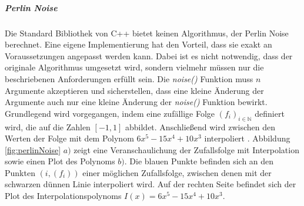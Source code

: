 \documentclass[11pt,a4paper]{article}
\begin{document}
\subparagraph{Perlin Noise}
Die Standard Bibliothek von C++ bietet keinen Algorithmus, der Perlin Noise berechnet. Eine eigene Implementierung hat den Vorteil, dass sie exakt an Voraussetzungen angepasst werden kann. Dabei ist es nicht notwendig, dass der originale Algorithmus umgesetzt wird, sondern vielmehr müssen nur die beschriebenen Anforderungen erfüllt sein. Die \textit{noise()} Funktion muss $n$ Argumente akzeptieren und sicherstellen, dass eine kleine Änderung der Argumente auch nur eine kleine Änderung der \textit{noise()} Funktion bewirkt.\\
Grundlegend wird vorgegangen, indem eine zufällige Folge $\left(f_i\right)_{i \in \mathbb{N}}$ definiert wird, die auf die Zahlen $[-1, 1]$ abbildet.
Anschließend wird zwischen den Werten der Folge mit dem Polynom $6x^5-15x^4+10x^3$ interpoliert \cite[S. 2]{bcc7190da8e90284b4e790817b8eed4ee3ea6cffbe5a23ef07a000ca5628ffbc}. Abbildung \ref{fig:perlinNoise} $a)$ zeigt eine Veranschaulichung der Zufallsfolge mit Interpolation sowie einen Plot des Polynoms $b)$. Die blauen Punkte befinden sich an den Punkten $\left(i, \left(f_i\right)\right)$ einer möglichen Zufallsfolge, zwischen denen mit der schwarzen dünnen Linie interpoliert wird. Auf der rechten Seite befindet sich der Plot des Interpolationspolynoms $I(x) = 6x^5-15x^4+10x^3$.
\end{document}
